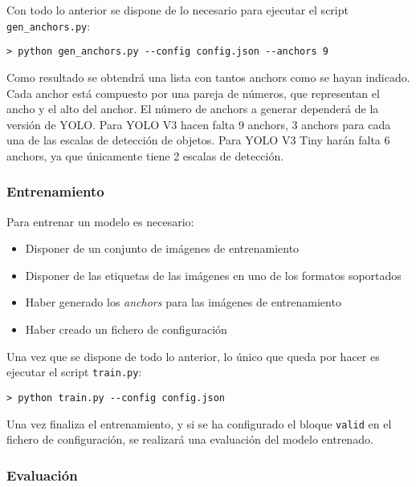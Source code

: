 Con todo lo anterior se dispone de lo necesario para ejecutar el script \texttt{gen\_anchors.py}:

\begin{lstlisting}[frame=single, basicstyle=\ttfamily\footnotesize, caption={Cómo generar los \textit{anchors}}, captionpos=b]
> python gen_anchors.py --config config.json --anchors 9
\end{lstlisting}

Como resultado se obtendrá una lista con tantos anchors como se hayan indicado. Cada anchor está compuesto por una pareja de números, que representan el ancho y el alto del anchor. El número de anchors a generar dependerá de la versión de YOLO. Para YOLO V3 hacen falta 9 anchors, 3 anchors para cada una de las escalas de detección de objetos. Para YOLO V3 Tiny harán falta 6 anchors, ya que únicamente tiene 2 escalas de detección.

\subsubsection*{Entrenamiento}

Para entrenar un modelo es necesario:

\begin{itemize}
	\item Disponer de un conjunto de imágenes de entrenamiento
	\item Disponer de las etiquetas de las imágenes en uno de los formatos soportados
	\item Haber generado los \textit{anchors} para las imágenes de entrenamiento
	\item Haber creado un fichero de configuración
\end{itemize}

Una vez que se dispone de todo lo anterior, lo único que queda por hacer es ejecutar el script \texttt{train.py}:

\begin{lstlisting}[frame=single, basicstyle=\ttfamily\footnotesize, caption={Cómo lanzar el entrenamiento}, captionpos=b]
> python train.py --config config.json
\end{lstlisting}

Una vez finaliza el entrenamiento, y si se ha configurado el bloque \texttt{valid} en el fichero de configuración, se realizará una evaluación del modelo entrenado.

\subsubsection*{Evaluación}

